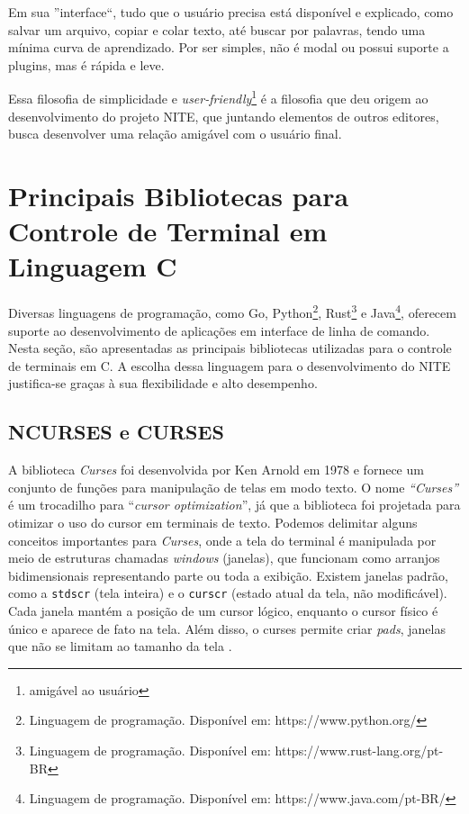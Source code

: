 Em sua ''interface``, tudo que o usuário precisa está disponível e explicado, como salvar um arquivo, copiar e colar texto, até buscar por palavras, tendo uma mínima curva de aprendizado. Por ser simples, não é modal ou possui suporte a plugins, mas é rápida e leve.

Essa filosofia de simplicidade e \textit{user-friendly}\footnote{amigável ao usuário} é a filosofia que deu origem ao desenvolvimento do projeto NITE, que juntando elementos de outros editores, busca desenvolver uma relação amigável com o usuário final.

\section{Principais Bibliotecas para Controle de Terminal em Linguagem C}

Diversas linguagens de programação, como Go, Python\footnote{Linguagem de programação. Disponível em: https://www.python.org/}, Rust\footnote{Linguagem de programação. Disponível em: https://www.rust-lang.org/pt-BR} e Java\footnote{Linguagem de programação. Disponível em: https://www.java.com/pt-BR/}, oferecem suporte ao desenvolvimento de aplicações em interface de linha de comando. Nesta seção, são apresentadas as principais bibliotecas utilizadas para o controle de terminais em C. A escolha dessa linguagem para o desenvolvimento do NITE justifica-se graças à sua flexibilidade e alto desempenho.

\subsection{NCURSES e CURSES}

A biblioteca \textit{Curses} foi desenvolvida por Ken Arnold em 1978 e fornece um conjunto de funções para manipulação de telas em modo texto. O nome \textit{``Curses''} é um trocadilho para ``\textit{cursor optimization}'', já que a biblioteca foi projetada para otimizar o uso do cursor em terminais de texto. Podemos delimitar alguns conceitos importantes para \textit{Curses}, onde a tela do terminal é manipulada por meio de estruturas chamadas \textit{windows} (janelas), que funcionam como arranjos bidimensionais representando parte ou toda a exibição. Existem janelas padrão, como a \texttt{stdscr} (tela inteira) e o \texttt{curscr} (estado atual da tela, não modificável). Cada janela mantém a posição de um cursor lógico, enquanto o cursor físico é único e aparece de fato na tela. Além disso, o curses permite criar \textit{pads}, janelas que não se limitam ao tamanho da tela \cite{ibm_curses_aix}.

